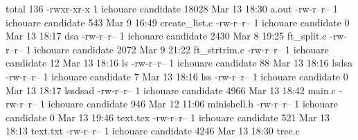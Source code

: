 total 136
-rwxr-xr-x  1 ichouare  candidate  18028 Mar 13 18:30 a.out
-rw-r--r--  1 ichouare  candidate    543 Mar  9 16:49 create_list.c
-rw-r--r--  1 ichouare  candidate      0 Mar 13 18:17 dsa
-rw-r--r--  1 ichouare  candidate   2430 Mar  8 19:25 ft_split.c
-rw-r--r--  1 ichouare  candidate   2072 Mar  9 21:22 ft_strtrim.c
-rw-r--r--  1 ichouare  candidate     12 Mar 13 18:16 ls
-rw-r--r--  1 ichouare  candidate     88 Mar 13 18:16 lsdsa
-rw-r--r--  1 ichouare  candidate      7 Mar 13 18:16 lss
-rw-r--r--  1 ichouare  candidate      0 Mar 13 18:17 lssdsad
-rw-r--r--  1 ichouare  candidate   4966 Mar 13 18:42 main.c
-rw-r--r--  1 ichouare  candidate    946 Mar 12 11:06 minishell.h
-rw-r--r--  1 ichouare  candidate      0 Mar 13 19:46 text.tex
-rw-r--r--  1 ichouare  candidate    521 Mar 13 18:13 text.txt
-rw-r--r--  1 ichouare  candidate   4246 Mar 13 18:30 tree.c
